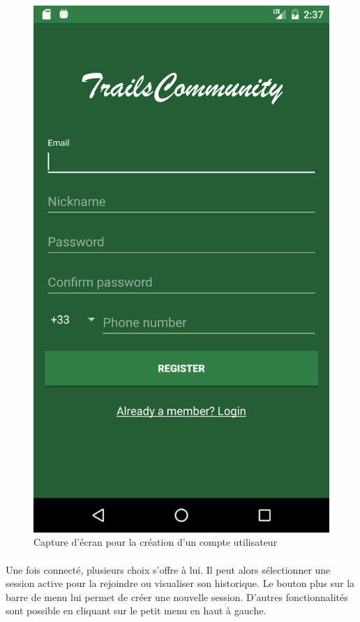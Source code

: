 \documentclass[titlepage, 12pt]{report}
\begin{document}
\begin{figure}[!h]
	\caption{Capture d'écran pour la création d'un compte utilisateur}
	\label{screenshots_register}
	\centering
	\includegraphics[scale=0.2]{Images/screenshots/register.png}
\end{figure}

\clearpage

\paragraph{}Une fois connecté, plusieurs choix s'offre à lui. Il peut alors sélectionner une session active pour la rejoindre ou visualiser son historique. Le bouton plus sur la barre de menu lui permet de créer une nouvelle session. D'autres fonctionnalités sont possible en cliquant sur le petit menu en haut à gauche.
\end{document}

